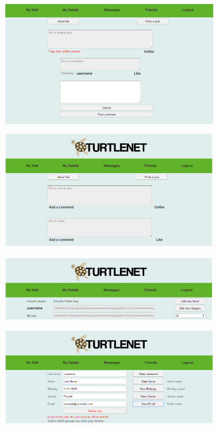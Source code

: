 \begin{centering}
\begin{figure}[p] \includegraphics[scale=0.5]{images/screenshots/crop7.png} \end{figure}
\begin{figure}[p] \includegraphics[scale=0.5]{images/screenshots/crop8.png} \end{figure}
\begin{figure}[p] \includegraphics[scale=0.5]{images/screenshots/crop9.png} \end{figure}
\begin{figure}[p] \includegraphics[scale=0.5]{images/screenshots/crop10.png} \end{figure}

\end{centering}
